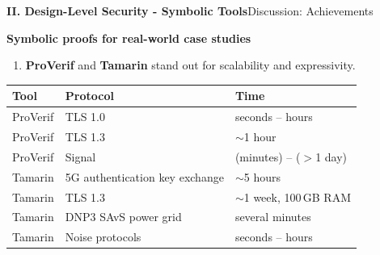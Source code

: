 \documentclass[10pt,aspectratio=1610,compress,dvipsnames]{beamer}
\begin{document}
\begin{frame}[fragile]{\bfseries II. Design-Level Security - Symbolic Tools}{Discussion: Achievements}
\begin{description}[style=nextline]
	\item[{\color{cseblue}\bfseries Achievements}] \textbf{Symbolic proofs for real-world case studies}
\end{description}
\begin{enumerate}[$\bullet$]
	\item \textbf{ProVerif} and \textbf{Tamarin} stand out for scalability and expressivity.
\end{enumerate}
\begin{table}[h]\footnotesize\renewcommand{\arraystretch}{1.3}
\begin{tabular}{l|l|l}
\toprule[1.2pt]
\textbf{Tool} & \textbf{Protocol} & \textbf{Time} \\
\midrule
ProVerif & TLS 1.0 & seconds -- hours \\
ProVerif & TLS 1.3 & $\sim$1 hour \\
ProVerif & Signal & (minutes) -- ($>$1 day) \\
\hline
Tamarin & 5G authentication key exchange & $\sim$5 hours \\
Tamarin & TLS 1.3 & $\sim$1 week, 100\,GB RAM \\
Tamarin & DNP3 SAvS power grid & several minutes \\
Tamarin & Noise protocols & seconds -- hours \\
\bottomrule[1.2pt]
\end{tabular}
\end{table}
\end{frame}
\end{document}
